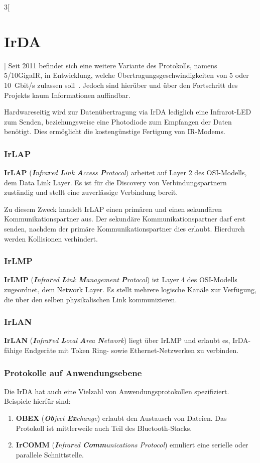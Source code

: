 \begin{multicols}{3}[\section{IrDA}]
Seit 2011 befindet sich eine weitere Variante des Protokolls, namens 5/10GigaIR, in Entwicklung, welche Übertragungsgeschwindigkeiten von 5 oder 10~Gbit/s zulassen soll~\cite{irdagiga}. Jedoch sind hierüber und über den Fortschritt des Projekts kaum Informationen auffindbar.

Hardwareseitig wird zur Datenübertragung via IrDA lediglich eine Infrarot-LED zum Senden, beziehungsweise eine Photodiode zum Empfangen der Daten benötigt. Dies ermöglicht die kostengünstige Fertigung von IR-Modems.
\subsubsection*{IrLAP}
\textbf{IrLAP} (\textit{\textbf{I}nfra\textbf{r}ed \textbf{L}ink \textbf{A}ccess \textbf{P}rotocol}) arbeitet auf Layer 2 des OSI-Modells, dem Data Link Layer. Es ist für die Discovery von Verbindungspartnern zuständig und stellt eine zuverlässige Verbindung bereit.

Zu diesem Zweck handelt IrLAP einen primären und einen sekundären Kommunikationspartner aus. Der sekundäre Kommunikationspartner darf erst senden, nachdem der primäre Kommunikationspartner dies erlaubt. Hierdurch werden Kollisionen verhindert.
\subsubsection*{IrLMP}
\textbf{IrLMP} (\textit{\textbf{I}nfra\textbf{r}ed \textbf{L}ink \textbf{M}anagement \textbf{P}rotocol}) ist Layer 4 des OSI-Modells zugeordnet, dem Network Layer. Es stellt mehrere logische Kanäle zur Verfügung, die über den selben physikalischen Link kommunizieren.
\subsubsection*{IrLAN}
\textbf{IrLAN} (\textit{\textbf{I}nfra\textbf{r}ed \textbf{L}ocal \textbf{A}rea \textbf{N}etwork}) liegt über IrLMP und erlaubt es, IrDA-fähige Endgeräte mit Token Ring- sowie Ethernet-Netzwerken zu verbinden.

\subsubsection*{Protokolle auf Anwendungsebene}
Die IrDA hat auch eine Vielzahl von Anwendungsprotokollen spezifiziert. Beispiele hierfür sind:
\begin{enumerate}
	\item \textbf{OBEX} (\textit{\textbf{Ob}ject \textbf{Ex}change}) erlaubt den Austausch von Dateien. Das Protokoll ist mittlerweile auch Teil des Bluetooth-Stacks.
	\item \textbf{IrCOMM} (\textit{\textbf{I}nfra\textbf{r}ed \textbf{Comm}unications Protocol}) emuliert eine serielle oder parallele Schnittstelle.
\end{enumerate}

\end{multicols}
\newpage
